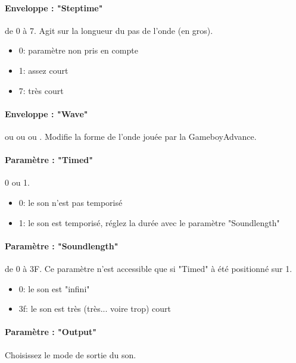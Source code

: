 \documentclass[12pt,a4paper]{article}
\begin{document}
    \paragraph{Enveloppe : "Steptime"} de 0 à 7.
    Agit sur la longueur du pas de l'onde (en gros).
    \medskip

    \begin{itemize}
        \item{0: paramètre non pris en compte}
        \item{1: assez court}
        \item{7: très court}
    \end{itemize}

    \paragraph{Enveloppe : "Wave"}  ou  ou  ou .
    Modifie la forme de l'onde jouée par la GameboyAdvance.

    \paragraph{Paramètre : "Timed"} 0 ou 1.
    \medskip

    \begin{itemize}
        \item{0: le son n'est pas temporisé}
        \item{1: le son est temporisé, réglez la durée avec le paramètre "Soundlength"}
    \end{itemize}

    \paragraph{Paramètre : "Soundlength"} de 0 à 3F.
    Ce paramètre n'est accessible que si "Timed" à été positionné sur 1.
    \medskip

    \begin{itemize}
        \item{0: le son est "infini"}
        \item{3f: le son est très (très... voire trop) court}
    \end{itemize}

    \paragraph{Paramètre : "Output"} Choisissez le mode de sortie du son.
    \medskip
\end{document}
